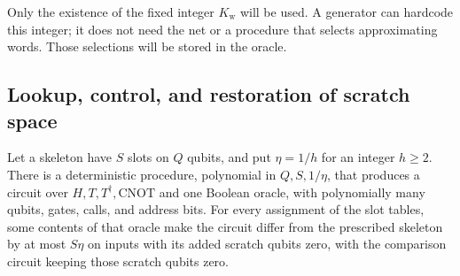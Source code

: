 Only the existence of the fixed integer $K_{\mathrm w}$ will be used. A generator can
hardcode this integer; it does not need the net or a procedure
that selects approximating words. Those selections will be stored in the
oracle.

\subsection{Lookup, control, and restoration of scratch space}

\begin{proposition}\label{compile:slots}
Let a skeleton have $S$ slots on $Q$ qubits, and put $\eta=1/h$ for an integer
$h\ge2$.
There is a deterministic procedure, polynomial in $Q,S,1/\eta$, that produces
a circuit over $H,T,T^\dagger,\mathrm{CNOT}$ and one Boolean oracle, with
polynomially many qubits, gates, calls, and address bits. For every assignment
of the slot tables, some contents of that oracle make the circuit differ
from the prescribed skeleton by at most $S\eta$ on inputs with its added
scratch qubits zero, with the comparison circuit keeping those scratch
qubits zero.
\end{proposition}

